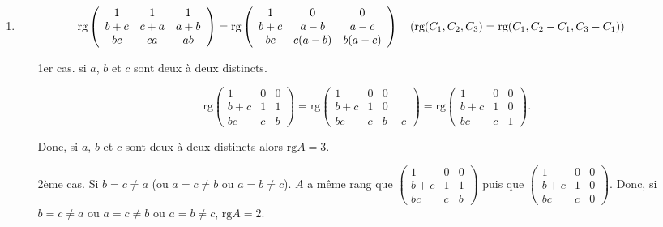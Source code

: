 {{\begin{enumerate}
Si $m=\frac{7}{36}$, $\mbox{rg}A=2$ (on note alors que $C_1=6(C_2-C_3)$) et si $m\neq\frac{7}{36}$, $\mbox{rg}A=3$ et $A$ est inversible.

\item  
\begin{align*}\ensuremath
\mbox{rg}\left(
\begin{array}{ccc}
1&1&1\\
b+c&c+a&a+b\\
bc&ca&ab
\end{array}
\right)&=\mbox{rg}\left(
\begin{array}{ccc}
1&0&0\\
b+c&a-b&a-c\\
bc&c(a-b)&b(a-c)
\end{array}
\right)\quad(\mbox{rg}(C_1,C_2,C_3)=\mbox{rg}(C_1,C_2-C_1,C_3-C_1))
\end{align*}

\begin{itemize}
\item[1er cas.] si $a$, $b$ et $c$ sont deux à deux distincts. 

$$\mbox{rg}\left(
\begin{array}{ccc}
1&0&0\\
b+c&1&1\\
bc&c&b
\end{array}
\right)=\mbox{rg}\left(
\begin{array}{ccc}
1&0&0\\
b+c&1&0\\
bc&c&b-c
\end{array}
\right)=\mbox{rg}\left(
\begin{array}{ccc}
1&0&0\\
b+c&1&0\\
bc&c&1
\end{array}
\right).$$

Donc, si $a$, $b$ et $c$ sont deux à deux distincts alors $\mbox{rg}A=3$.

\item[2ème cas.] Si $b=c\neq a$ (ou $a=c\neq b$ ou $a=b\neq c$).
$A$ a même rang que $\left(
\begin{array}{ccc}
1&0&0\\
b+c&1&1\\
bc&c&b
\end{array}
\right)$ puis que $\left(
\begin{array}{ccc}
1&0&0\\
b+c&1&0\\
bc&c&0
\end{array}
\right)$. Donc, si $b=c\neq a$ ou $a=c\neq b$ ou $a=b\neq c$, $\mbox{rg}A=2$.


\end{itemize}
\end{enumerate}}}
